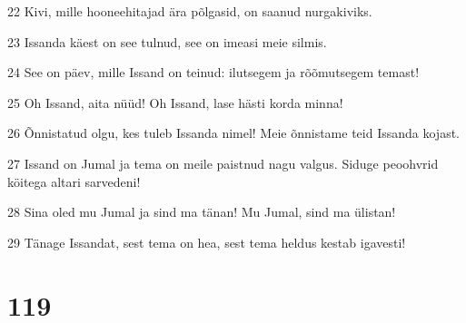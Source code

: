 \par 22 Kivi, mille hooneehitajad ära põlgasid, on saanud nurgakiviks.
\par 23 Issanda käest on see tulnud, see on imeasi meie silmis.
\par 24 See on päev, mille Issand on teinud: ilutsegem ja rõõmutsegem temast!
\par 25 Oh Issand, aita nüüd! Oh Issand, lase hästi korda minna!
\par 26 Õnnistatud olgu, kes tuleb Issanda nimel! Meie õnnistame teid Issanda kojast.
\par 27 Issand on Jumal ja tema on meile paistnud nagu valgus. Siduge peoohvrid köitega altari sarvedeni!
\par 28 Sina oled mu Jumal ja sind ma tänan! Mu Jumal, sind ma ülistan!
\par 29 Tänage Issandat, sest tema on hea, sest tema heldus kestab igavesti!

\chapter{119}

